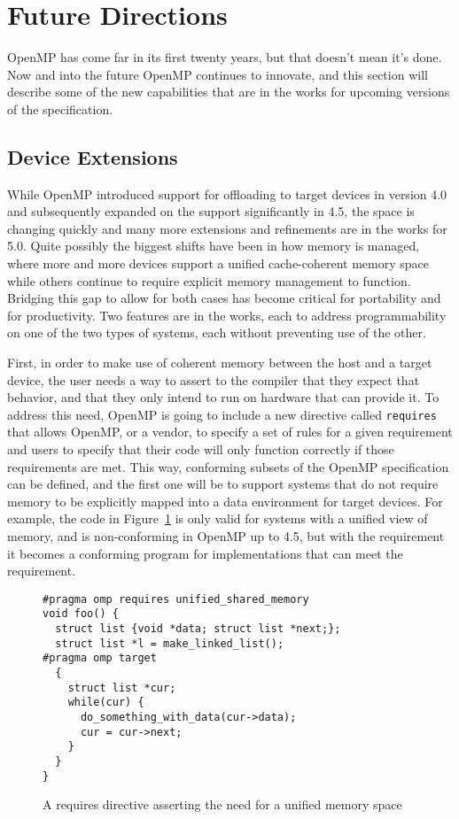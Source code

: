 \section{Future Directions}
\label{sec:future_directions}

OpenMP has come far in its first twenty years, but that doesn't mean it's done.
Now and into the future OpenMP continues to innovate, and this section will
describe some of the new capabilities that are in the works for upcoming
versions of the specification.

\subsection{Device Extensions}
\label{sub:device_extensions}

While OpenMP introduced support for offloading to target devices in version 4.0
and subsequently expanded on the support significantly in 4.5, the space is
changing quickly and many more extensions and refinements are in the works for
5.0.  Quite possibly the biggest shifts have been in how memory is managed,
where more and more devices support a unified cache-coherent memory space
while others continue to require explicit memory management to function.
Bridging this gap to allow for both cases has become critical for portability
and for productivity.  Two features are in the works, each to address
programmability on one of the two types of systems, each without preventing use
of the other.

First, in order to make use of coherent memory between the host and a target
device, the user needs a way to assert to the compiler that they expect that
behavior, and that they only intend to run on hardware that can provide it.  To
address this need, OpenMP is going to include a new directive called
\texttt{requires} that allows OpenMP, or a vendor, to specify a set of rules for
a given requirement and users to specify that their code will only function
correctly if those requirements are met.  This way, conforming subsets of the
OpenMP specification can be defined, and the first one will be to support
systems that do not require memory to be explicitly mapped into a data
environment for target devices.  For example, the code in
Figure~\ref{fig:unified} is only valid for systems with a unified view of
memory, and is non-conforming in OpenMP up to 4.5, but with the requirement it
becomes a conforming program for implementations that can meet the requirement.

\begin{figure}
\begin{verbatim}
#pragma omp requires unified_shared_memory
void foo() {
  struct list {void *data; struct list *next;};
  struct list *l = make_linked_list();
#pragma omp target
  {
    struct list *cur;
    while(cur) {
      do_something_with_data(cur->data);
      cur = cur->next;
    }
  }
}
\end{verbatim}
\caption{A requires directive asserting the need for a unified memory space}
\label{fig:unified}
\end{figure}

